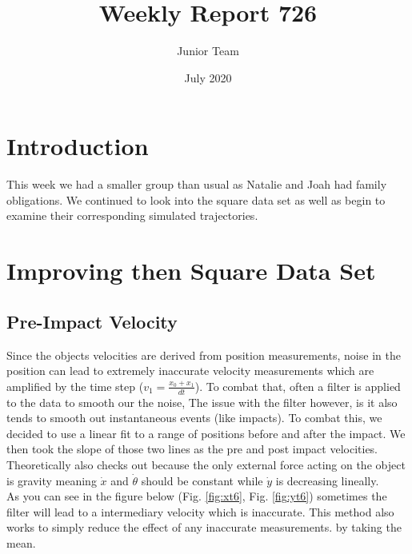 \documentclass{article}
\title{Weekly Report 726}
\author{Junior Team }
\date{July 2020}
\begin{document}
\maketitle

\section{Introduction}
This week we had a smaller group than usual as Natalie and Joah had family obligations. We continued to look into the square data set as well as begin to examine their corresponding simulated trajectories. 

\section{Improving then Square Data Set}
\subsection{Pre-Impact Velocity}
Since the objects velocities are derived from position measurements, noise in the position can lead to extremely inaccurate velocity measurements which are amplified by the time step ($v_1 = \frac{x_0 + x_1}{dt}$).
To combat that, often a filter is applied to the data to smooth our the noise, The issue with the filter however, is it also tends to smooth out instantaneous events (like impacts). To combat this, we decided to use a linear fit to a range of positions before and after the impact. We then took the slope of those two lines as the pre and post impact velocities. Theoretically also checks out because the only external force acting on the object is gravity meaning $\dot{x}$ and $\dot{\theta}$ should be constant while $\dot{y}$ is decreasing lineally.\\

\noindent As you can see in the figure below (Fig. \ref{fig:xt6}, Fig. \ref{fig:yt6}) sometimes the filter will lead to a intermediary velocity which is inaccurate. This method also works to simply reduce the effect of any inaccurate measurements. by taking the mean. 
\end{document}
